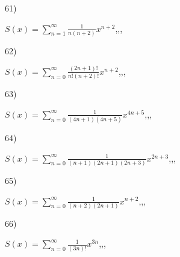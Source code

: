 \documentclass[11pt, ukrainian]{article}
\begin{document}
\par
\newpage
61) \space 
{%
{$S(x)=\sum\limits_{n=1}^{\infty}{\frac{1}{n(n+2)}}{x^{{n+2}}}$},,, \par \smallskip  
}
\par
\vspace{0.9cm}
62) \space 
{%
{$S(x)=\sum\limits_{n=0}^{\infty}{\frac{(2n+1)!}{n!(n+2)!}}{x^{{n+2}}}$},,, \par \smallskip  
}
\par
\vspace{0.9cm}
63) \space 
{%
{$S(x)=\sum\limits_{n=0}^{\infty}{\frac{1}{(4n+1)(4n+5)}}{x^{{4n+5}}}$},,, \par \smallskip  
}
\par
\vspace{0.9cm}
64) \space 
{%
{$S(x)=\sum\limits_{n=0}^{\infty}{\frac{1}{(n+1)(2n+1)(2n+3)}}{x^{{2n+3}}}$},,, \par \smallskip  
}
\par
\vspace{0.9cm}
65) \space 
{%
{$S(x)=\sum\limits_{n=0}^{\infty}{\frac{1}{(n+2)(2n+1)}}{x^{{n+2}}}$},,, \par \smallskip  
}
\par
\vspace{0.9cm}
66) \space 
{%
{$S(x)=\sum\limits_{n=0}^{\infty}{\frac{1}{(3n)!}}{x^{{3n}}}$},,, \par \smallskip  
}
\end{document}
